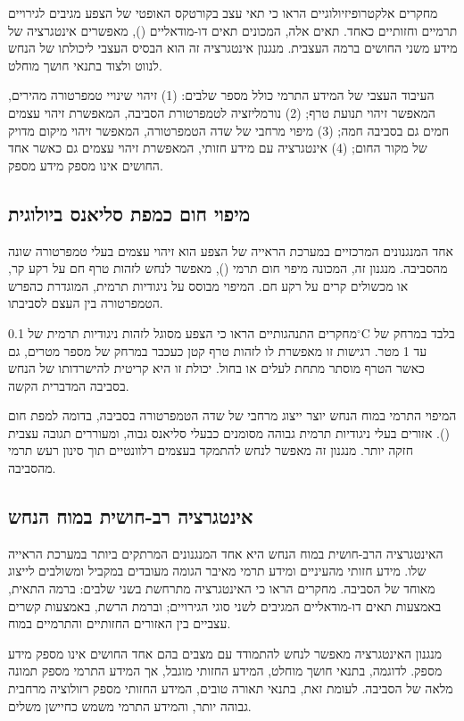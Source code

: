 מחקרים אלקטרופיזיולוגיים הראו כי תאי עצב בקורטקס האופטי של הצפע מגיבים לגירויים תרמיים וחזותיים כאחד. תאים אלה, המכונים תאים דו-מודאליים (), מאפשרים אינטגרציה של מידע משני החושים ברמה העצבית. מנגנון אינטגרציה זה הוא הבסיס העצבי ליכולתו של הנחש לנווט ולצוד בתנאי חושך מוחלט.

העיבוד העצבי של המידע התרמי כולל מספר שלבים: (1) זיהוי שינויי טמפרטורה מהירים, המאפשר זיהוי תנועת טרף; (2) נורמליזציה לטמפרטורת הסביבה, המאפשרת זיהוי עצמים חמים גם בסביבה חמה; (3) מיפוי מרחבי של שדה הטמפרטורה, המאפשר זיהוי מיקום מדויק של מקור החום; (4) אינטגרציה עם מידע חזותי, המאפשרת זיהוי עצמים גם כאשר אחד החושים אינו מספק מידע מספק.

\subsection{מיפוי חום כמפת סליאנס ביולוגית}
\label{sec:ch02_saliency}

אחד המנגנונים המרכזיים במערכת הראייה של הצפע הוא זיהוי עצמים בעלי טמפרטורה שונה מהסביבה. מנגנון זה, המכונה מיפוי חום תרמי (), מאפשר לנחש לזהות טרף חם על רקע קר, או מכשולים קרים על רקע חם. המיפוי מבוסס על ניגודיות תרמית, המוגדרת כהפרש הטמפרטורה בין העצם לסביבתו.

מחקרים התנהגותיים הראו כי הצפע מסוגל לזהות ניגודיות תרמית של 0.1$^{\circ}$C בלבד במרחק של עד 1 מטר. רגישות זו מאפשרת לו לזהות טרף קטן כעכבר במרחק של מספר מטרים, גם כאשר הטרף מוסתר מתחת לעלים או בחול. יכולת זו היא קריטית להישרדותו של הנחש בסביבה המדברית הקשה.

המיפוי התרמי במוח הנחש יוצר ייצוג מרחבי של שדה הטמפרטורה בסביבה, בדומה למפת חום (). אזורים בעלי ניגודיות תרמית גבוהה מסומנים כבעלי סליאנס גבוה, ומעוררים תגובה עצבית חזקה יותר. מנגנון זה מאפשר לנחש להתמקד בעצמים רלוונטיים תוך סינון רעש תרמי מהסביבה.

\subsection{אינטגרציה רב-חושית במוח הנחש}
\label{sec:ch02_multi_sensory}

האינטגרציה הרב-חושית במוח הנחש היא אחד המנגנונים המרתקים ביותר במערכת הראייה שלו. מידע חזותי מהעיניים ומידע תרמי מאיבר הגומה מעובדים במקביל ומשולבים לייצוג מאוחד של הסביבה. מחקרים הראו כי האינטגרציה מתרחשת בשני שלבים: ברמה התאית, באמצעות תאים דו-מודאליים המגיבים לשני סוגי הגירויים; וברמת הרשת, באמצעות קשרים עצביים בין האזורים החזותיים והתרמיים במוח.

מנגנון האינטגרציה מאפשר לנחש להתמודד עם מצבים בהם אחד החושים אינו מספק מידע מספק. לדוגמה, בתנאי חושך מוחלט, המידע החזותי מוגבל, אך המידע התרמי מספק תמונה מלאה של הסביבה. לעומת זאת, בתנאי תאורה טובים, המידע החזותי מספק רזולוציה מרחבית גבוהה יותר, והמידע התרמי משמש כחיישן משלים.

